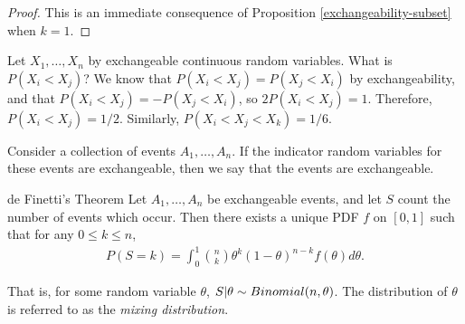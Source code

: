 \begin{proof}
    This is an immediate consequence of Proposition \ref{exchangeability-subset} when $k = 1$.
\end{proof}

\begin{exmp}
    Let $X_1, \ldots, X_n$ by exchangeable continuous random variables. What is $P(X_i < X_j)$? We know that $P(X_i < X_j) = P(X_j < X_i)$ by exchangeability, and that $P(X_i < X_j) =  - P(X_j < X_i)$, so $2P(X_i < X_j) = 1$. Therefore, $P(X_i < X_j) = 1/2$. Similarly, $P(X_i < X_j < X_k) = 1/6$.
\end{exmp}

\begin{defn}
    Consider a collection of events $A_1, \ldots, A_n$. If the indicator random variables for these events are exchangeable, then we say that the events are exchangeable.
\end{defn}

\begin{thm}{de Finetti's Theorem}\label{de-finetti}\proofbreak
    Let $A_1, \ldots, A_n$ be exchangeable events, and let $S$ count the number of events which occur. Then there exists a unique PDF $f$ on $[0, 1]$ such that for any $0 \leq k \leq n$,
    \begin{align*}
        P(S = k) = \int_{0}^{1}\binom{n}{k}\theta^{k}(1-\theta)^{n-k}f(\theta)d\theta.
    \end{align*}

    That is, for some random variable $\theta$, $S | \theta \sim Binomial(n, \theta)$. The distribution of $\theta$ is referred to as the \emph{mixing distribution}.
\end{thm}
